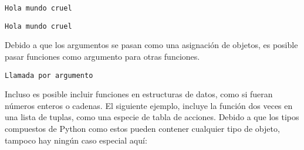 \begin{Shaded}
\begin{Highlighting}[]

\NormalTok{)}
\end{Highlighting}
\end{Shaded}

\begin{verbatim}
Hola mundo cruel
\end{verbatim}

\begin{Shaded}
\begin{Highlighting}[]
\OperatorTok{=}
\NormalTok{)}
\end{Highlighting}
\end{Shaded}

\begin{verbatim}
Hola mundo cruel
\end{verbatim}

Debido a que los argumentos se pasan como una asignación de objetos, es
posible pasar funciones como argumento para otras funciones.

\begin{Shaded}
\begin{Highlighting}[]

\NormalTok{)}
\end{Highlighting}
\end{Shaded}

\begin{verbatim}
Llamada por argumento
\end{verbatim}

Incluso es posible incluir funciones en estructuras de datos, como si
fueran números enteros o cadenas. El siguiente ejemplo, incluye la
función dos veces en una lista de tuplas, como una especie de tabla de
acciones. Debido a que los tipos compuestos de Python como estos pueden
contener cualquier tipo de objeto, tampoco hay ningún caso especial
aquí:

\begin{Shaded}
\begin{Highlighting}[]
\OperatorTok{=}\NormalTok{ [(echo, }\NormalTok{)]}
\end{Highlighting}
\end{Shaded}

